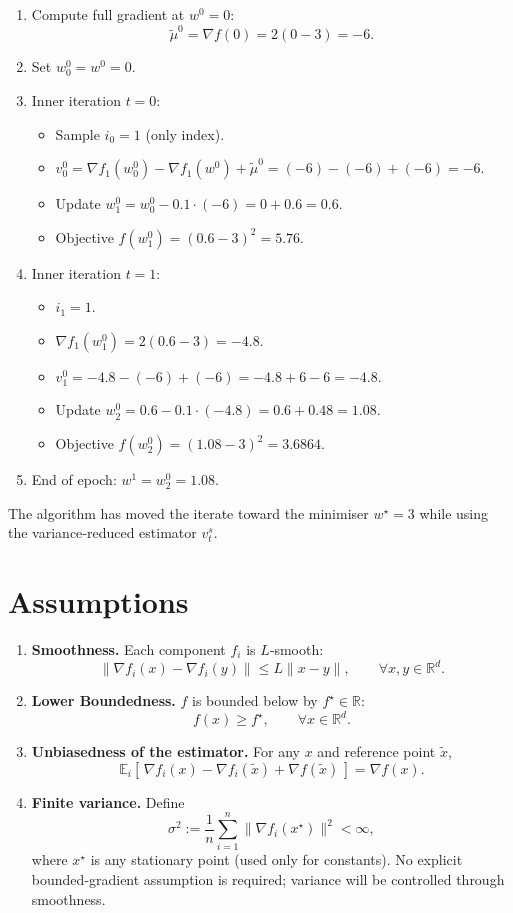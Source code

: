\documentclass{article}
\newcommand{\E}{\mathbb{E}}
\newcommand{\R}{\mathbb{R}}
\begin{document}
\begin{enumerate}[label=\textbf{Step \arabic*:}, leftmargin=*]
\item Compute full gradient at $w^{0}=0$:
\[
\tilde{\mu}^{0}= \nabla f(0)=2(0-3)=-6.
\]
\item Set $w_0^{0}=w^{0}=0$.

\item Inner iteration $t=0$:
\begin{itemize}
\item Sample $i_0=1$ (only index).
\item $v_0^{0}= \nabla f_1(w_0^{0})-\nabla f_1(w^{0})+\tilde{\mu}^{0}
          =(-6)-(-6)+(-6)=-6.$
\item Update $w_1^{0}=w_0^{0}-0.1\cdot(-6)=0+0.6=0.6.$
\item Objective $f(w_1^{0})=(0.6-3)^2=5.76$.
\end{itemize}

\item Inner iteration $t=1$:
\begin{itemize}
\item $i_1=1$.
\item $\nabla f_1(w_1^{0})=2(0.6-3)=-4.8$.
\item $v_1^{0}= -4.8-(-6)+(-6)= -4.8+6-6=-4.8.$
\item Update $w_2^{0}=0.6-0.1\cdot(-4.8)=0.6+0.48=1.08.$
\item Objective $f(w_2^{0})=(1.08-3)^2=3.6864$.
\end{itemize}

\item End of epoch: $w^{1}=w_2^{0}=1.08$.
\end{enumerate}
The algorithm has moved the iterate toward the minimiser $w^\star=3$ while using the variance‑reduced estimator $v_t^{s}$.

\newpage
\section*{Assumptions}
\begin{enumerate}[label=\textbf{A\arabic*:}, leftmargin=*]
\item \textbf{Smoothness.} Each component $f_i$ is $L$‑smooth:
\[
\|\nabla f_i(x)-\nabla f_i(y)\|\le L\|x-y\|,\qquad\forall x,y\in\R^{d}.
\tag{A1}
\]
\item \textbf{Lower Boundedness.} $f$ is bounded below by $f^\star\in\R$:
\[
f(x)\ge f^\star,\qquad\forall x\in\R^{d}.
\tag{A2}
\]
\item \textbf{Unbiasedness of the estimator.} For any $x$ and reference point $\tilde{x}$,
\[
\E_{i}\!\left[\,\nabla f_i(x)-\nabla f_i(\tilde{x})+\nabla f(\tilde{x})\,\right]=\nabla f(x).
\tag{A3}
\]
\item \textbf{Finite variance.} Define
\[
\sigma^2:=\frac{1}{n}\sum_{i=1}^{n}\|\nabla f_i(x^\star)\|^{2}<\infty,
\]
where $x^\star$ is any stationary point (used only for constants).  
No explicit bounded‑gradient assumption is required; variance will be controlled through smoothness.
\end{enumerate}
\end{document}
